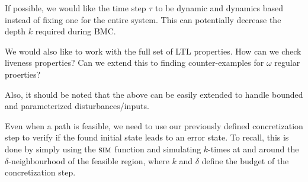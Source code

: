 If possible, we would like the time step $\tau$ to be dynamic
and dynamics based instead of fixing one for the entire system. This
can potentially decrease the depth $k$ required during BMC.

We would also like to work with the full set of LTL properties. How
can we check liveness properties? Can we extend this to finding
counter-examples for $\omega$ regular proerties?

Also, it should be noted that the above can be easily extended to
handle bounded and parameterized disturbances/inputs.

Even when a path is feasible, we need to use our previously defined
concretization step to verify if the found initial state leads to an
error state. To recall, this is done by simply using the $\mbox{\sc sim}$
function and simulating $k$-times at and around the
$\delta$-neighbourhood of the feasible region, where $k$ and $\delta$
define the budget of the concretization step.
